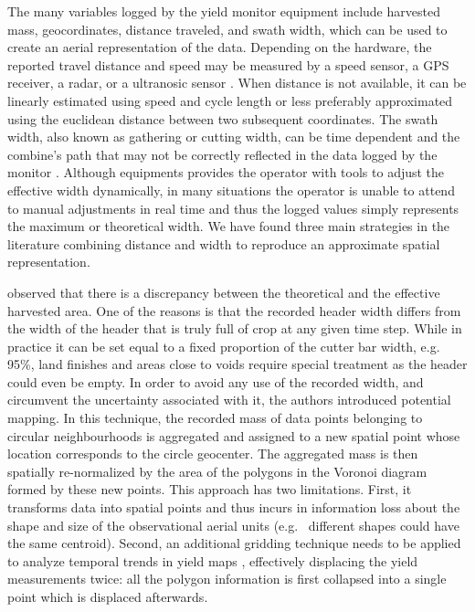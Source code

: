 The many variables logged by the yield monitor equipment include
harvested mass, geocordinates, distance traveled, and swath width,
which can be used to create an aerial representation of the
data. Depending on the hardware, the reported travel distance and
speed may be measured by a speed sensor, a GPS receiver, a radar, or a
ultranosic sensor \citep{Mulla2013}. When distance is not available,
it can be linearly estimated using speed and cycle length or less
preferably approximated using the euclidean distance between two
subsequent coordinates. The swath width, also known as gathering or
cutting width, can be time dependent and the combine's path that may
not be correctly reflected in the data logged by the monitor
\citep{Ross2008}. Although equipments provides the operator with tools
to adjust the effective width dynamically, in many situations the
operator is unable to attend to manual adjustments in real time and
thus the logged values simply represents the maximum or theoretical
width. We have found three main strategies in the literature combining
distance and width to reproduce an approximate spatial representation.

\cite{Blackmore1999} observed that there is a discrepancy between the
theoretical and the effective harvested area. One of the reasons is
that the recorded header width differs from the width of the header
that is truly full of crop at any given time step. While in practice it
can be set equal to a fixed proportion of the cutter bar width,
e.g. 95\%, land finishes and areas close to voids require special
treatment as the header could even be empty. In order to avoid any use
of the recorded width, and circumvent the uncertainty associated with
it, the authors introduced potential mapping. In this technique, the
recorded mass of data points belonging to circular neighbourhoods is
aggregated and assigned to a new spatial point whose location
corresponds to the circle geocenter. The aggregated mass is then
spatially re-normalized by the area of the polygons in the Voronoi
diagram formed by these new points. This approach has two
limitations. First, it transforms data into spatial points and thus
incurs in information loss about the shape and size of the
observational aerial units (e.g. \ different shapes could have the
same centroid). Second, an additional gridding technique needs to be
applied to analyze temporal trends in yield maps
\citep{Blackmore2003}, effectively displacing the yield measurements
twice: all the polygon information is first collapsed into a single
point which is displaced afterwards.

